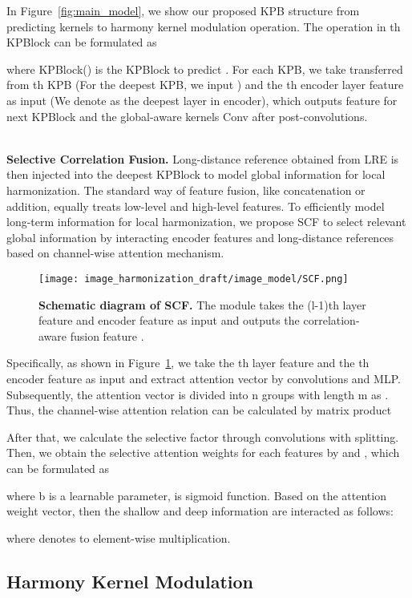 \documentclass[10pt,twocolumn,letterpaper]{article}
\begin{document}
In Figure~\ref{fig:main_model}, we show our proposed KPB structure from predicting kernels to harmony kernel modulation operation. The operation in th KPBlock can be formulated as

where KPBlock() is the KPBlock to predict . For each KPB, we take  transferred from th KPB (For the deepest KPB, we input ) and the th encoder layer feature  as input  (We denote  as the deepest layer in encoder), which outputs feature  for next KPBlock and the global-aware kernels  Conv after post-convolutions.

~\\
\noindent \textbf{Selective Correlation Fusion.}
Long-distance reference  obtained from LRE is then injected into the deepest KPBlock to model global information for local harmonization. The standard way of feature fusion, like concatenation or addition, equally treats low-level and high-level features. To efficiently model long-term information for local harmonization, we propose SCF to select relevant global information by interacting encoder features  and long-distance references based on channel-wise attention mechanism. 

\begin{figure}[!t]
    \centering
    \texttt{[image: image\_harmonization\_draft/image\_model/SCF.png]}
    \caption{{\bf Schematic diagram of SCF.} The module takes the (l-1)th layer feature  and encoder feature  as input and outputs the correlation-aware fusion feature .}
    \label{fig:jsf}
    \vspace{-1.0em}
\end{figure} 

Specifically, as shown in Figure~\ref{fig:jsf}, we take the th layer feature  and the th encoder feature  as input and extract attention vector  by  convolutions and MLP. Subsequently, the attention vector is divided into n groups with length m as . Thus, the channel-wise attention relation can be calculated by matrix product


After that, we calculate the selective factor  through  convolutions with splitting. Then, we obtain the selective attention weights  for each features by  and  , which can be formulated as

where b is a learnable parameter,  is sigmoid function. Based on the attention weight vector, then the shallow and deep information are interacted as follows:

where  denotes to element-wise multiplication.

\subsection{Harmony Kernel Modulation}
\label{sec:pixel_filtering}
\end{document}

